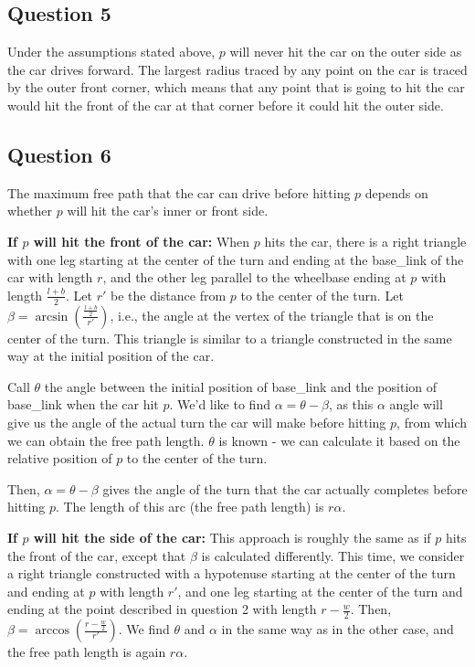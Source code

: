 \subsection*{Question 5}
Under the assumptions stated above, $p$ will never hit the car on the outer side as the car drives forward. The largest radius traced by any point on the car is traced by the outer front corner, which means that any point that is going to hit the car would hit the front of the car at that corner before it could hit the outer side.

\subsection*{Question 6}
The maximum free path that the car can drive before hitting $p$ depends on whether $p$ will hit the car's inner or front side.

\noindent
\textbf{If $p$ will hit the front of the car:} When $p$ hits the car, there is a right triangle with one leg starting at the center of the turn and ending at the base\_link of the car with length $r$, and the other leg parallel to the wheelbase ending at $p$ with length $\frac{l + b}{2}$. Let $r'$ be the distance from $p$ to the center of the turn. Let $\beta = \arcsin(\frac{\frac{l + b}{2}} {r'})$, i.e., the angle at the vertex of the triangle that is on the center of the turn. This triangle is similar to a triangle constructed in the same way at the initial position of the car. 

Call $\theta$ the angle between the initial position of base\_link and the position of base\_link when the car hit $p$. We'd like to find $\alpha = \theta - \beta$, as this $\alpha$ angle will give us the angle of the actual turn the car will make before hitting $p$, from which we can obtain the free path length. $\theta$ is known - we can calculate it based on the relative position of $p$ to the center of the turn. 

Then, $\alpha = \theta - \beta$ gives the angle of the turn that the car actually completes before hitting $p$. The length of this arc (the free path length) is $r\alpha$.

\noindent
\textbf{If $p$ will hit the side of the car:} This approach is roughly the same as if $p$ hits the front of the car, except that $\beta$ is calculated differently. This time, we consider a right triangle constructed with a hypotenuse starting at the center of the turn and ending at $p$ with length $r'$, and one leg starting at the center of the turn and ending at the point described in question 2 with length $r - \frac{w}{2}$. Then, $\beta = \arccos(\frac{r-\frac{w}{2}}{r'})$. We find $\theta$ and $\alpha$ in the same way as in the other case, and the free path length is again $r\alpha$.

